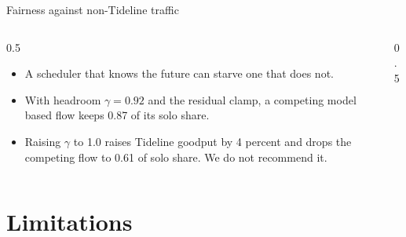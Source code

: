 \documentclass[aspectratio=169,10pt]{beamer}
\newcommand{\sysname}{Tideline}
\begin{document}
\begin{frame}{Fairness against non-\sysname{} traffic}
  \begin{columns}[T]
    \begin{column}{0.5\textwidth}
      \begin{itemize}
        \item<1-> A scheduler that knows the future can starve one that does not.
        \item<2-> With headroom $\gamma = 0.92$ and the residual clamp, a competing model based flow
          keeps 0.87 of its solo share.
        \item<3-> Raising $\gamma$ to 1.0 raises \sysname{} goodput by 4 percent and drops the
          competing flow to 0.61 of solo share. We do not recommend it.
      \end{itemize}
    \end{column}
    \begin{column}{0.5\textwidth}
      \centering
    \end{column}
  \end{columns}
\end{frame}

\section{Limitations}
\end{document}
